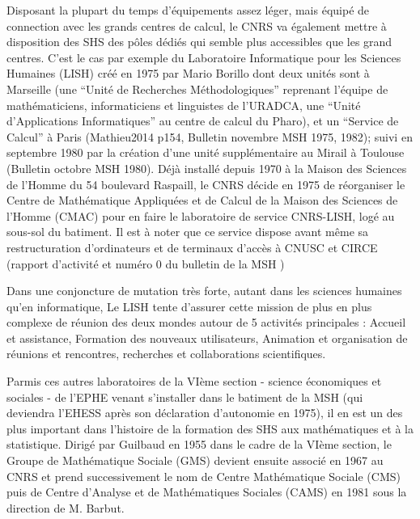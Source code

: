 Disposant la plupart du temps d'équipements assez léger, mais équipé de connection avec les grands centres de calcul, le CNRS va également mettre à disposition des SHS des pôles dédiés qui semble plus accessibles que les grand centres. C’est le cas par exemple du Laboratoire Informatique pour les Sciences Humaines (LISH) \autocite{MSH1975} créé en 1975 par Mario Borillo dont deux unités sont à Marseille (une \enquote{Unité de Recherches Méthodologiques} reprenant l'équipe de mathématiciens, informaticiens et linguistes de l'URADCA, une \enquote{Unité d’Applications Informatiques} au centre de calcul du Pharo), et un \enquote{Service de Calcul} à Paris (Mathieu2014 p154, Bulletin novembre MSH 1975, 1982); suivi en septembre 1980 par la création d’une unité supplémentaire au Mirail à Toulouse (Bulletin octobre MSH 1980). Déjà installé depuis 1970 à la Maison des Sciences de l'Homme du 54 boulevard Raspaill, le CNRS décide en 1975 de réorganiser le Centre de Mathématique Appliquées et de Calcul de la Maison des Sciences de l’Homme (CMAC) pour en faire le laboratoire de service CNRS-LISH, logé au sous-sol du batiment. Il est à noter que ce service dispose avant même sa restructuration d’ordinateurs et de terminaux d’accès à CNUSC et CIRCE (rapport d’activité \autocite{CNRS1972} et numéro 0 du bulletin de la MSH \autocite{MSH1973})

Dans une conjoncture de mutation très forte, autant dans les sciences humaines qu'en informatique, Le LISH tente d'assurer cette mission de plus en plus complexe de réunion des deux mondes autour de 5 activités principales : Accueil et assistance, Formation des nouveaux utilisateurs, Animation et organisation de réunions et rencontres, recherches et collaborations scientifiques. \autocite{LISH1980}


Parmis ces autres laboratoires de la VIème section - science économiques et sociales - de l'EPHE venant s'installer dans le batiment de la MSH (qui deviendra l'EHESS après son déclaration d'autonomie en 1975), il en est un des plus important dans l'histoire de la formation des SHS aux mathématiques et à la statistique. Dirigé par Guilbaud en 1955 dans le cadre de la VIème section, le Groupe de Mathématique Sociale (GMS) devient ensuite associé en 1967 au CNRS et prend successivement le nom de Centre Mathématique Sociale (CMS) puis de Centre d’Analyse et de Mathématiques Sociales (CAMS) en 1981 sous la direction de M. Barbut.

